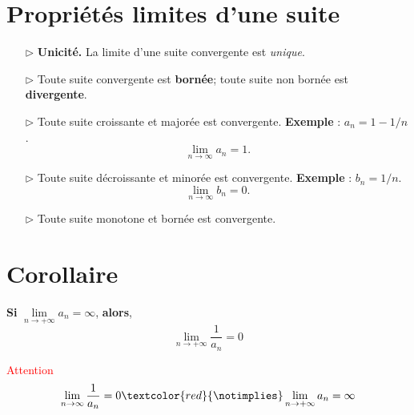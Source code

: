 \documentclass{report}
\begin{document}
\begin{multicols*}{3}
    
    \section{Propriétés limites d'une suite}
    \begin{itemize}
        \item[$\rhd$] \textbf{Unicité.} La limite d'une suite convergente est \textit{unique}.
        
        \item[$\rhd$] Toute suite convergente est \textbf{bornée};  
            toute suite non bornée est \textbf{divergente}.        
        \item[$\rhd$] Toute suite croissante et majorée est convergente. 
            \textbf{Exemple} : \( a_n = 1 - 1/n \). 
        \[
        \lim_{n \to \infty} a_n = 1.
        \]
        
        \item[$\rhd$] Toute suite décroissante et minorée est convergente. \textbf{Exemple} : \( b_n = 1/n \).
        \[
        \lim_{n \to \infty} b_n = 0.
        \]
        
        \item[$\rhd$] Toute suite monotone et bornée est convergente.
    \end{itemize}

    


    \section{Corollaire}
    \textbf{Si} $\lim\limits_{n\to+\infty }a_n  = \infty$,  
    \textbf{alors}, 
    \[ \lim\limits_{n\to+\infty }{\dfrac{1}{a_n}}  = 0 \]

    \textcolor{red}{Attention} 
        \begin{align*}
            \lim\limits_{n\to\infty  }\frac{1}{a_n} = 0 
            \textcolor{red}{\notimplies}
            \lim\limits_{n\to+\infty }a_n  = \infty
        \end{align*}  



\end{multicols*}
\end{document}
